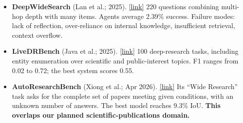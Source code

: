 \documentclass[10pt]{article}
\newcommand{\paper}[3]{\textbf{#1} \textnormal{(#2)}. \href{#3}{\small[link]}}
\begin{document}
\begin{itemize}
\begin{itemize}
  \item \emph{Scoring:} judges re-fetch the cited pages; there is no static gold set.
  \item \emph{Results:} best soft F1 0.36 and hard F1 0.13. Performance ``drops as target volume and hierarchy
  depth increase''. Bottlenecks: incomplete discovery, missing enrichment and incomplete evidence.
  \item \emph{Closest to our answer-size finding,} but not controlled and not separated from task difficulty.
  \end{itemize}
\item \paper{DeepWideSearch}{Lan et al.; 2025}{https://arxiv.org/abs/2510.20168}
220 questions combining multi-hop depth with many items. Agents average 2.39\% success. Failure modes: lack of
reflection, over-reliance on internal knowledge, insufficient retrieval, context overflow.
\item \paper{LiveDRBench}{Java et al.; 2025}{https://arxiv.org/abs/2508.04183}
100 deep-research tasks, including entity enumeration over scientific and public-interest topics. F1 ranges from
0.02 to 0.72; the best system scores 0.55.
\item \paper{AutoResearchBench}{Xiong et al.; Apr 2026}{https://arxiv.org/abs/2604.25256}
Its ``Wide Research'' task asks for the complete set of papers meeting given conditions, with an unknown number of
answers. The best model reaches 9.3\% IoU. \textbf{This overlaps our planned scientific-publications domain.}
\end{itemize}
\end{document}
